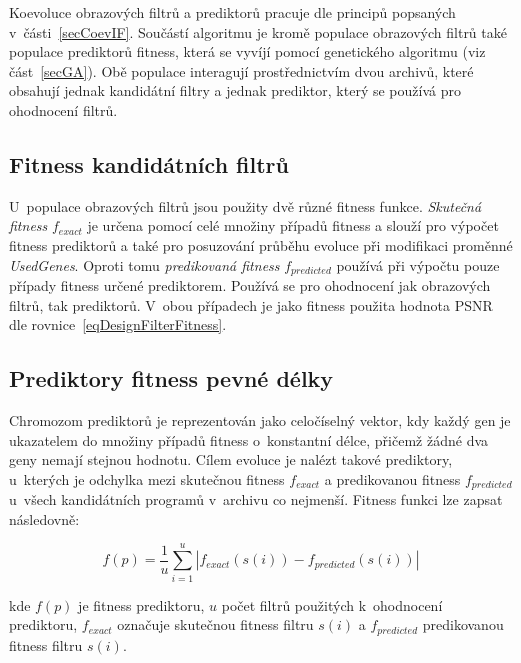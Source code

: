 Koevoluce obrazových filtrů a prediktorů pracuje dle principů popsaných v~části~\ref{secCoevIF}. Součástí algoritmu je kromě populace obrazových filtrů také populace prediktorů fitness, která se vyvíjí pomocí genetického algoritmu (viz část~\ref{secGA}). Obě populace interagují prostřednictvím dvou archivů, které obsahují jednak kandidátní filtry a jednak prediktor, který se používá pro ohodnocení filtrů.

\subsection{Fitness kandidátních filtrů}

U~populace obrazových filtrů jsou použity dvě různé fitness funkce. \emph{Skutečná fitness} $f_{\mathit{exact}}$ je určena pomocí celé množiny případů fitness a slouží pro výpočet fitness prediktorů a také pro posuzování průběhu evoluce při modifikaci proměnné \emph{UsedGenes}. Oproti tomu \emph{predikovaná fitness} $f_{\mathit{predicted}}$ používá při výpočtu pouze případy fitness určené prediktorem. Používá se pro ohodnocení jak obrazových filtrů, tak prediktorů. V~obou případech je jako fitness použita hodnota PSNR dle rovnice~\ref{eqDesignFilterFitness}.

\subsection{Prediktory fitness pevné délky}

Chromozom prediktorů je reprezentován jako celočíselný vektor, kdy každý gen je ukazatelem do množiny případů fitness o~konstantní délce, přičemž žádné dva geny nemají stejnou hodnotu. Cílem evoluce je nalézt takové prediktory, u~kterých je odchylka mezi skutečnou fitness $f_{\mathit{exact}}$ a predikovanou fitness $f_{\mathit{predicted}}$ u~všech kandidátních programů v~archivu co nejmenší. Fitness funkci lze zapsat následovně:

\begin{equation}
    \label{eqDesignPredFitness}
    f \left( p \right) = \frac{1}{u} \sum\limits_{i=1}^{u} \left| f_{\mathit{exact}} \left( s\left( i \right) \right) - f_{\mathit{predicted}} \left( s\left( i \right) \right) \right|
\end{equation}

\noindent{}kde $f \left( p \right)$ je fitness prediktoru, $u$ počet filtrů použitých k~ohodnocení prediktoru, $f_{\mathit{exact}}$ označuje skutečnou fitness filtru $s\left( i \right)$ a $f_{\mathit{predicted}}$ predikovanou fitness filtru $s\left( i \right)$.

